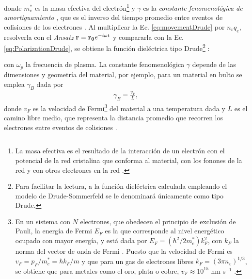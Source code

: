 donde $m_e^*$ es la masa efectiva del electrón\footnote{La masa efectiva es el resultado de la interacción de un electrón con el potencial de la red cristalina que conforma al material, con los fonones de la red y con otros electrones en la red \cite{gross2014festkorperphysik}. } \cite{gross2014festkorperphysik} y $\gamma$ es la \emph{constante fenomenológica de amortiguamiento} \cite{kreibig1995clusters}, que es el inverso del tiempo promedio entre eventos de colisiones  de los electrones \cite{novotny2006principles,gross2014festkorperphysik}.  Al multiplicar la Ec.  \eqref{eq:movementDrude} por $n_v q_e$, resolverla con el \emph{Ansatz} $\vb{r} = \vb{r_0}e^{-i\omega t}$ y compararla con la Ec.  \eqref{eq:PolarizationDrude}, se obtiene la función dieléctrica tipo Drude\footnote{Para facilitar la lectura, a la función dieléctrica calculada empleando el modelo de Drude-Sommerfeld se le denominará únicamente como tipo Drude.} \cite{novotny2006principles,gross2014festkorperphysik}:  \vspace*{-.75em}
%
	\begin{tcolorbox}[title = Modelo de Drude-Sommerfeld, breakable ]
	\end{tcolorbox}\vspace*{-.75em}\noindent
%
con $\omega_p$ la frecuencia de plasma. La constante fenomenológica $\gamma$ depende de las dimensiones y geometría del material, por ejemplo, para un material en bulto se emplea  $\gamma_B$ dada por \cite{kreibig1995clusters} 
%
	\begin{align}
	\gamma_B = \frac{v_F}{L},
			 \label{eq:gammaInf}	
	\end{align}
%
donde $v_F$ es la velocidad de Fermi\footnote{En un sistema con $N$ electrones, que obedecen el principio  de exclusión de Pauli, la energía de Fermi $E_F$ es la que corresponde al nivel energético ocupado con mayor energía, y está dada por $E_F = (\hbar^2/2m_e^*)k_F^2$, con $k_F$ la norma del vector de onda de Fermi \cite{gross2014festkorperphysik}.  Puesto que la velocidad de Fermi es $v_F = p_F/m_e^* = \hbar k_F / m$ y que para un gas de electrones libres $k_F=(3\pi n_v)^{1/3}$, se obtiene que para metales como el oro, plata o cobre,  $v_F\approx 10^{15}$ nm s$^{-1}$ \cite{gross2014festkorperphysik,ashcroft1976solid}. } del material a una temperatura dada y $L$ es el camino libre medio, que representa la distancia promedio que recorren los electrones entre eventos de colisiones \cite{gross2014festkorperphysik}.  

